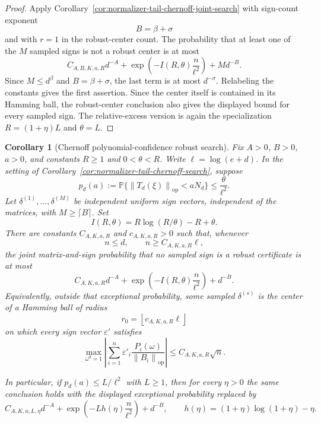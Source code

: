\documentclass[11pt]{amsart}
\numberwithin{equation}{section}
\newtheorem{corollary}[theorem]{Corollary}
\theoremstyle{definition}
\theoremstyle{remark}
\newcommand{\op}{\mathrm{op}}
\newcommand{\Prob}{\mathbb P}
\newcommand{\norm}[1]{\left\lVert #1\right\rVert}
\newcommand{\eps}{\varepsilon}
\begin{document}
\begin{proof}
Apply Corollary~\ref{cor:normalizer-tail-chernoff-joint-search} with sign-count
exponent
\[
  B=\beta+\sigma
\]
and with \(r=1\) in the robust-center count.  The probability that at least one
of the \(M\) sampled signs is not a robust center is at most
\[
  C_{A,B,K,a,R}d^{-A}
  +\exp\left(-I(R,\theta)\frac n{\ell^2}\right)
  +M d^{-B}.
\]
Since \(M\le d^\beta\) and \(B=\beta+\sigma\), the last term is at most
\(d^{-\sigma}\).  Relabeling the constants gives the first assertion.  Since
the center itself is contained in its Hamming ball, the robust-center conclusion
also gives the displayed bound for every sampled sign.  The relative-excess
version is again the specialization \(R=(1+\eta)L\) and \(\theta=L\).
\end{proof}

\begin{corollary}[Chernoff polynomial-confidence robust search]
\label{cor:normalizer-tail-chernoff-poly-confidence}
Fix \(A>0\), \(B>0\), \(a>0\), and constants \(R\ge1\) and \(0<\theta<R\).
Write \(\ell=\log(e+d)\).  In the setting of
Corollary~\ref{cor:normalizer-tail-chernoff-search}, suppose
\[
  p_d(a):=\Prob\{\norm{T_d(\xi)}_{\op}<aN_d\}\le \frac{\theta}{\ell^2}.
\]
Let \(\delta^{(1)},\ldots,\delta^{(M)}\) be independent uniform sign vectors,
independent of the matrices, with \(M\ge\lceil B\rceil\).  Set
\[
  I(R,\theta)=R\log(R/\theta)-R+\theta .
\]
There are constants \(C_{A,K,a,R}\) and \(c_{A,K,a,R}>0\) such that, whenever
\[
  n\le d,\qquad n\ge C_{A,K,a,R}\ell ,
\]
the joint matrix-and-sign probability that no sampled sign is a robust
certificate is at most
\[
  C_{A,K,a,R}d^{-A}
  +\exp\left(-I(R,\theta)\frac n{\ell^2}\right)
  +d^{-B}.
\]
Equivalently, outside that exceptional probability, some sampled
\(\delta^{(s)}\) is the center of a Hamming ball of radius
\[
  r_0=\left\lfloor c_{A,K,a,R}\ell\right\rfloor
\]
on which every sign vector \(\eps'\) satisfies
\[
  \max_{\omega^d=1}\left|\sum_{i=1}^n
  \eps'_i\frac{P_i(\omega)}{\norm{B_i}_{\op}}\right|
  \le C_{A,K,a,R}\sqrt n .
\]

In particular, if \(p_d(a)\le L/\ell^2\) with \(L\ge1\), then for every
\(\eta>0\) the same conclusion holds with the displayed exceptional probability
replaced by
\[
  C_{A,K,a,L,\eta}d^{-A}
  +\exp\left(-Lh(\eta)\frac n{\ell^2}\right)
  +d^{-B},
  \qquad h(\eta)=(1+\eta)\log(1+\eta)-\eta .
\]
\end{corollary}
\end{document}
